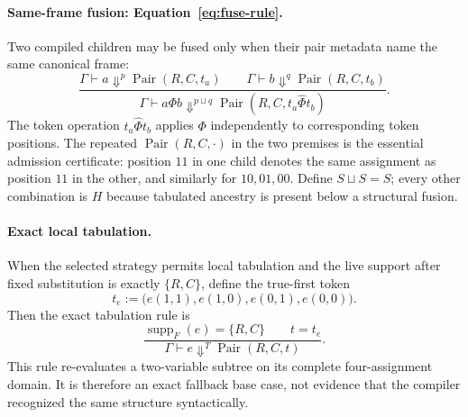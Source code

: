 \documentclass[10pt]{article}
\newcommand{\ptop}[1]{\widehat{#1}}
\newcommand{\Pair}{\operatorname{Pair}}
\newcommand{\supp}{\operatorname{supp}}
\theoremstyle{plain}
\theoremstyle{definition}
\theoremstyle{remark}
\begin{document}
\paragraph{Same-frame fusion: Equation~\eqref{eq:fuse-rule}.}
Two compiled children may be fused only when their pair metadata name the same canonical frame:
\begin{equation}
\frac{\Gamma\vdash a\Downarrow^p\Pair(R,C,t_a)
\qquad
\Gamma\vdash b\Downarrow^q\Pair(R,C,t_b)}
{\Gamma\vdash a\Phi b\Downarrow^{p\sqcup q}\Pair(R,C,t_a\ptop{\Phi}t_b)}.
\label{eq:fuse-rule}
\end{equation}
The token operation $t_a\ptop{\Phi}t_b$ applies $\Phi$ independently to corresponding token positions. The repeated $\Pair(R,C,\cdot)$ in the two premises is the essential admission certificate: position $11$ in one child denotes the same assignment as position $11$ in the other, and similarly for $10,01,00$. Define $S\sqcup S=S$; every other combination is $H$ because tabulated ancestry is present below a structural fusion.

\paragraph{Exact local tabulation.}
When the selected strategy permits local tabulation and the live support after fixed substitution is exactly $\{R,C\}$, define the true-first token
\begin{equation}
 t_e:=\bigl(e(1,1),e(1,0),e(0,1),e(0,0)\bigr).
 \label{eq:tab-token}
\end{equation}
Then the exact tabulation rule is
\[
\frac{
  \supp_F(e)=\{R,C\}
  \qquad t=t_e
}{
  \Gamma\vdash e\Downarrow^T\Pair(R,C,t)
}.
\]
This rule re-evaluates a two-variable subtree on its complete four-assignment domain. It is therefore an exact fallback base case, not evidence that the compiler recognized the same structure syntactically.
\end{document}
